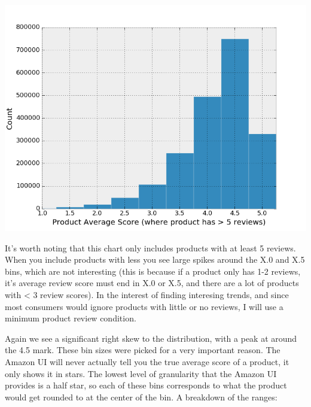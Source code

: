 \documentclass[a4paper,11pt]{article}
\begin{document}
\begin{center}
    \includegraphics[scale=0.65]{starbins_gt_5.png}
\end{center}

It's worth noting that this chart only includes products with at least 5 reviews. When you include products with less you see large spikes around the X.0 and X.5 bins, which are not interesting (this is because if a product only has 1-2 reviews, it's average review score must end in X.0 or X.5, and there are a lot of products with < 3 review scores). In the interest of finding interesing trends, and since most consumers would ignore products with little or no reviews, I will use a minimum product review condition.

Again we see a significant right skew to the distribution, with a peak at around the 4.5 mark. These bin sizes were picked for a very important reason. The Amazon UI will never actually tell you the true average score of a product, it only shows it in stars. The lowest level of granularity that the Amazon UI provides is a half star, so each of these bins corresponds to what the product would get rounded to at the center of the bin. A breakdown of the ranges:
\end{document}
